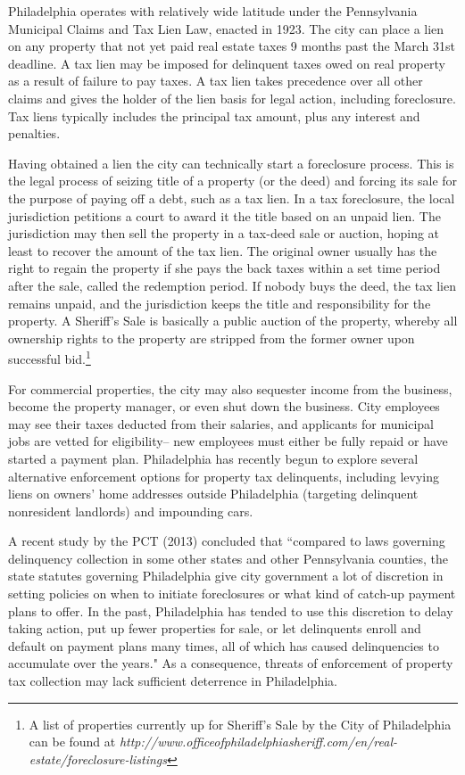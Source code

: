 \documentclass[12pt,titlepage]{article}
\begin{document}
Philadelphia operates with relatively wide latitude under the
Pennsylvania Municipal Claims and Tax Lien Law, enacted in 1923. The
city can place a lien on any property that not yet paid real estate
taxes 9 months past the March 31st deadline. A tax lien may be imposed
for delinquent taxes owed on real property as a result of failure to
pay taxes.  A tax lien takes precedence over all other claims and
gives the holder of the lien basis for legal action, including
foreclosure.  Tax liens typically includes the principal tax amount,
plus any interest and penalties.

Having obtained a lien the city can technically start a foreclosure
process. This is the legal process of seizing title of a property (or
the deed) and forcing its sale for the purpose of paying off a debt,
such as a tax lien. In a tax foreclosure, the local jurisdiction
petitions a court to award it the title based on an unpaid lien. The
jurisdiction may then sell the property in a tax-deed sale or auction,
hoping at least to recover the amount of the tax lien. The original
owner usually has the right to regain the property if she pays the
back taxes within a set time period after the sale, called the
redemption period. If nobody buys the deed, the tax lien remains
unpaid, and the jurisdiction keeps the title and responsibility for
the property. A Sheriff's Sale is basically a public auction of the
property, whereby all ownership rights to the property are stripped
from the former owner upon successful bid.\footnote{A list of
  properties currently up for Sheriff's Sale by the City of
  Philadelphia can be found at
  \it{http://www.officeofphiladelphiasheriff.com/en/real-estate/foreclosure-listings}}

For commercial properties, the city may also sequester income from the
business, become the property manager, or even shut down the
business. City employees may see their taxes deducted from their
salaries, and applicants for municipal jobs are vetted for
eligibility-- new employees must either be fully repaid or have
started a payment plan. Philadelphia has recently begun to explore
several alternative enforcement options for property tax delinquents,
including levying liens on owners' home addresses outside Philadelphia
(targeting delinquent nonresident landlords) and impounding cars.

A recent study by the PCT (2013) concluded that ``compared to laws
governing delinquency collection in some other states and other
Pennsylvania counties, the state statutes governing Philadelphia give
city government a lot of discretion in setting policies on when to
initiate foreclosures or what kind of catch-up payment plans to
offer. In the past, Philadelphia has tended to use this discretion to
delay taking action, put up fewer properties for sale, or let
delinquents enroll and default on payment plans many times, all of
which has caused delinquencies to accumulate over the years." As a
consequence, threats of enforcement of property tax
collection may lack sufficient deterrence in Philadelphia.
\end{document}
